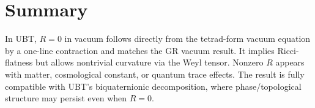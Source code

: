\documentclass[12pt]{article}
\begin{document}
\section{Summary}
In UBT, $R=0$ in vacuum follows directly from the tetrad-form vacuum equation by a one-line contraction and matches the GR vacuum result. It implies Ricci-flatness but allows nontrivial curvature via the Weyl tensor. Nonzero $R$ appears with matter, cosmological constant, or quantum trace effects. The result is fully compatible with UBT's biquaternionic decomposition, where phase/topological structure may persist even when $R=0$.
\end{document}
